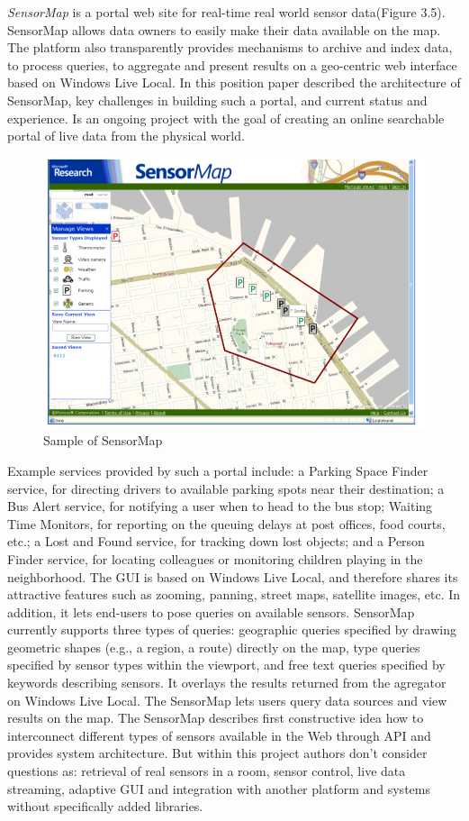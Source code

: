     \emph{SensorMap}\cite{nath2006challenges} is a portal web site for real-time real world sensor data(Figure 3.5). 
		SensorMap allows data owners to easily make their data available on the map. The platform also transparently provides mechanisms to archive and index data, to process queries, to aggregate and present results on a geo-centric web interface based on Windows Live Local. In this position paper  described the architecture of SensorMap, key challenges in building such a portal, and current status and experience. Is an ongoing project with the goal of creating an online searchable portal of live data from the physical world.
		\begin{figure}[!ht]
		\centering
		\includegraphics[scale=0.5]{Material/examples/SensorMap.png}   
		\caption[Sample of SensorMap]{Sample of SensorMap}                  
		\end{figure}
		 Example services provided by such a portal include: a Parking Space Finder service, for directing drivers to available parking spots near their destination; a Bus Alert service, for notifying a user when to head to the bus stop; Waiting Time Monitors, for reporting on the queuing delays at post offices, food courts, etc.; a Lost and Found service, for tracking down lost objects; and a Person Finder service, for locating colleagues or monitoring children playing in the neighborhood. The GUI is based on Windows Live Local, and therefore shares its attractive features such as zooming, panning, street maps, satellite images, etc. In addition, it lets end-users to pose queries on available sensors. SensorMap currently supports three types of queries: geographic queries specified by drawing geometric shapes (e.g., a region, a route) directly on the map, type queries specified by sensor types within the viewport, and free text queries specified by keywords describing sensors. It overlays the results returned from the agregator on Windows Live Local. The SensorMap lets users query data sources and view results on the map. The SensorMap describes first constructive idea how to interconnect different types of sensors available in the Web through API and provides system architecture. But within this project authors don't consider questions as: retrieval of real sensors in a room, sensor control, live data streaming, adaptive GUI and integration with another platform and systems without specifically added libraries. 
  

